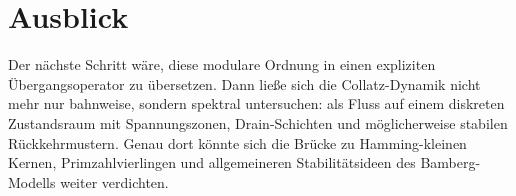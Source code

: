 \documentclass[12pt,a4paper]{article}
\begin{document}
\section*{Ausblick}

Der nächste Schritt wäre, diese modulare Ordnung in einen expliziten Übergangsoperator zu übersetzen. Dann ließe sich die Collatz-Dynamik nicht mehr nur bahnweise, sondern spektral untersuchen: als Fluss auf einem diskreten Zustandsraum mit Spannungszonen, Drain-Schichten und möglicherweise stabilen Rückkehrmustern. Genau dort könnte sich die Brücke zu Hamming-kleinen Kernen, Primzahlvierlingen und allgemeineren Stabilitätsideen des Bamberg-Modells weiter verdichten.
\end{document}
